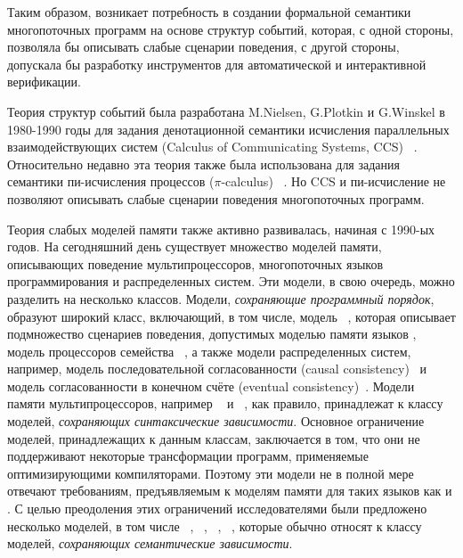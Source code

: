 Таким образом, возникает потребность в создании формальной семантики 
многопоточных программ на основе структур событий, 
которая, с одной стороны, позволяла бы описывать слабые сценарии поведения, 
с другой стороны, допускала бы разработку  
инструментов для автоматической и интерактивной верификации. 

{\progress}

Теория структур событий была разработана M.Nielsen, G.Plotkin и G.Winskel
в 1980-1990 годы для задания денотационной семантики 
исчисления параллельных взаимодействующих систем (Calculus of Communicating Systems, CCS)%
~\autocite{Winskel:ICALP1982}.
Относительно недавно эта теория также была использована 
для задания семантики пи-исчисления процессов ($\pi$-calculus)%
~\autocite{Varacca-Nobuko:TCS10,Crafa-al:FSCCS12,Hildebrandt-al:LATA2017}.
Но CCS и пи-исчисление не позволяют описывать 
слабые сценарии поведения многопоточных программ.

Теория слабых моделей памяти также активно развивалась, начиная с 1990-ых годов. 
На сегодняшний день существует множество моделей памяти, 
описывающих поведение мультипроцессоров, 
многопоточных языков программирования и распределенных систем. 
Эти модели, в свою очередь, можно разделить на несколько классов. 
Модели, \emph{сохраняющие программный порядок}, образуют широкий класс, 
включающий, в том числе, модель \RCMM~\autocite{Lahav-al:PLDI17},
которая описывает подмножество сценариев поведения, допустимых моделью памяти языков \CPP,
модель \TSO процессоров семейства \Intel~\autocite{Sewell-al:CACM10},
а также модели распределенных систем, 
например, модель последовательной согласованности (causal consistency)~\autocite{Lahav-Boker:PLDI2020}
и модель согласованности в конечном счёте (eventual consistency)~\autocite{Jagadeesan-al:ESOP2018}.
Модели памяти мультипроцессоров, например ~\autocite{Pulte-al:POPL18} 
и \POWER~\autocite{Sarkar-al:PLDI11}, 
как правило, принадлежат к классу моделей, \emph{сохраняющих синтаксические зависимости}. 
Основное ограничение моделей, принадлежащих к данным классам, заключается в том, 
что они не поддерживают некоторые трансформации программ, 
применяемые оптимизирующими компиляторами. 
Поэтому эти модели не в полной мере отвечают требованиям, 
предъявляемым к моделям памяти для таких языков как \CPP и \Java. 
С целью преодоления этих ограничений исследователями 
были предложено несколько моделей, в том числе 
\Prm~\autocite{Kang-al:POPL17}, \Wkm~\autocite{Chakraborty-Vafeiadis:POPL19}, 
\MRD~\autocite{Paviotti-al:ESOP20}, \PwP~\autocite{Jagadeesan-al:OOPSLA2020},
которые обычно относят к классу моделей, \emph{сохраняющих семантические зависимости}.

